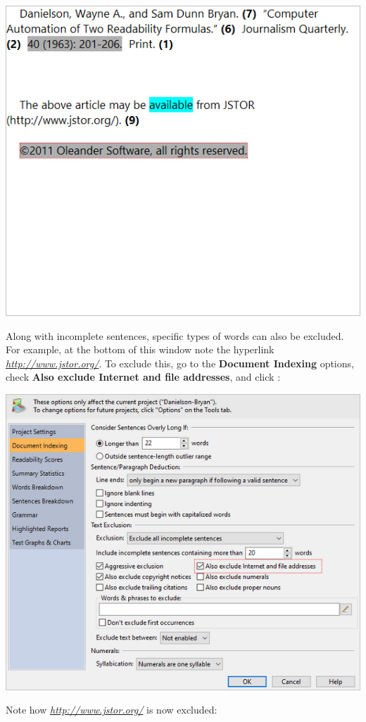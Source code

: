 \documentclass[
]{book}
\theoremstyle{definition}
\theoremstyle{definition}
\theoremstyle{definition}
\theoremstyle{definition}
\theoremstyle{remark}
\begin{document}
\begin{center}\includegraphics[width=0.75\linewidth,]{Images/ExclusionExampleCopyrightExcludedNow} \end{center}

Along with incomplete sentences, specific types of words can also be excluded. For example, at the bottom of this window note the hyperlink \emph{\url{http://www.jstor.org/}}. To exclude this, go to the \textbf{Document Indexing} options, check \textbf{Also exclude Internet and file addresses}, and click :

\includegraphics{Images/ExclusionExampleUrlExcluded.png}

Note how \emph{\url{http://www.jstor.org/}} is now excluded:
\end{document}
